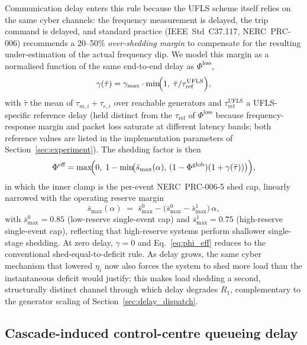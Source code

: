 Communication delay enters this rule because the UFLS scheme itself
relies on the same cyber channels: the frequency measurement is
delayed, the trip command is delayed, and standard practice
(IEEE~Std~C37.117, NERC~PRC-006) recommends a 20--50\%
\emph{over-shedding margin} to compensate for the resulting
under-estimation of the actual frequency dip.  We model this margin
as a normalised function of the same end-to-end delay as
$\Phi^{\text{loss}}$,
\begin{equation}\label{eq:gamma_ufls}
  \gamma(\bar\tau)
   = \gamma_{\max}\cdot\min\!\Bigl(1,\;\bar\tau/\tau_{\text{ref}}^{\text{UFLS}}\Bigr),
\end{equation}
with $\bar\tau$ the mean of $\tau_{m,i}+\tau_{e,i}$ over reachable
generators and $\tau_{\text{ref}}^{\text{UFLS}}$ a UFLS-specific
reference delay (held distinct from the $\tau_{\text{ref}}$ of
$\Phi^{\text{loss}}$ because frequency-response margin and packet
loss saturate at different latency bands; both reference values are
listed in the implementation parameters of
Section~\ref{sec:experiment}).  The shedding factor is then
\begin{equation}\label{eq:phi_eff}
  \Phi^{\text{eff}}
    = \max\!\Bigl(0,\;1-\min\!\bigl(\bar s_{\max}(\alpha),\,
                  (1-\Phi^{\text{glob}})(1+\gamma(\bar\tau))\bigr)\Bigr),
\end{equation}
in which the inner clamp is the per-event NERC~PRC-006-5 shed cap,
linearly narrowed with the operating reserve margin
\begin{equation}\label{eq:smax_alpha}
  \bar s_{\max}(\alpha)\;=\;\bar s_{\max}^{0}-\bigl(\bar s_{\max}^{0}-\bar s_{\max}^{1}\bigr)\,\alpha,
\end{equation}
with $\bar s_{\max}^{0}=0.85$ (low-reserve single-event cap) and
$\bar s_{\max}^{1}=0.75$ (high-reserve single-event cap), reflecting
that high-reserve systems perform shallower single-stage shedding.  At zero delay,
$\gamma=0$ and Eq.~\eqref{eq:phi_eff} reduces to the conventional
shed-equal-to-deficit rule.  As delay grows, the same cyber
mechanism that lowered $\eta_i$ now also forces the system to
shed more load than the instantaneous deficit would justify; this
makes load shedding a second, structurally distinct channel through
which delay degrades $R_1$, complementary to the generator scaling
of Section~\ref{sec:delay_dispatch}.

\subsection{Cascade-induced control-centre queueing delay}\label{sec:tauq}

